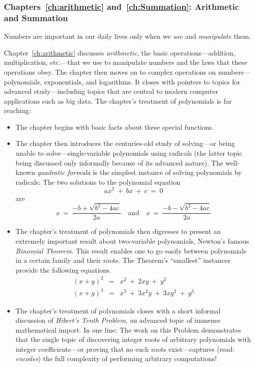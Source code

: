 \subsubsection{Chapters~\ref{ch:arithmetic} and~\ref{ch:Summation}:
Arithmetic and Summation}

Numbers are important in our daily lives only when we {\em use} and
{\em manipulate} them.

Chapter~\ref{ch:arithmetic} discusses {\it arithmetic}, the basic
operations---addition, multiplication, etc.---that we use to
manipulate numbers and the laws that these operations obey.  The
chapter then moves on to complex operations on numbers---polynomials,
exponentials, and logarithms.  It closes with pointers to topics for
advanced study---including topics that are central to modern computer
applications such as big data.  The chapter's treatment of polynomials
is far reaching:
\begin{itemize}
\item
The chapter begins with basic facts about these special functions.
\item
The chapter then introduces the centuries-old study of solving---or
being unable to solve---single-variable polynomials using radicals
(the latter topic being discussed only informally because of its
advanced nature).  The well-known {\it quadratic formula} is the
simplest instance of solving polynomials by radicals: The two
solutions to the polynomial equation
\[ ax^2 \ + \ bx \ + \ c \ = \ 0 \]
are
\[ x \ = \ \frac{-b + \sqrt{b^2 - 4ac}}{2a}
 \ \ \ \mbox{ and } \ \ \
   x \ = \ \frac{-b - \sqrt{b^2 - 4ac}}{2a}
\]
\item
The chapter's treatment of polynomials then digresses to present an
extremely important result about two-variable polynomials, Newton's
famous {\it Binomial Theorem}.  This result enables one to go easily
between polynomials in a certain family and their roots.  The
Theorem's ``smallest'' instances provide the following equations.
\begin{eqnarray*}
(x + y)^2 & = & x^2 \ + \ 2xy \ + \ y^2 \\
(x + y)^3 & = & x^3 \ + \ 3x^2y \ + \ 3 xy^2 \ + \ y^3
\end{eqnarray*}
\item
The chapter's treatment of polynomials closes with a short informal
discussion of {\it Hibert's Tenth Problem}, an advanced topic of
immense mathematical import.  In one line: The work on this Problem
demonstrates that the single topic of discovering integer roots of
arbitrary polynomials with integer coefficients---or proving that no
such roots exist---captures (read: {\em encodes}) the full complexity
of performing arbitrary computations!
\end{itemize}
